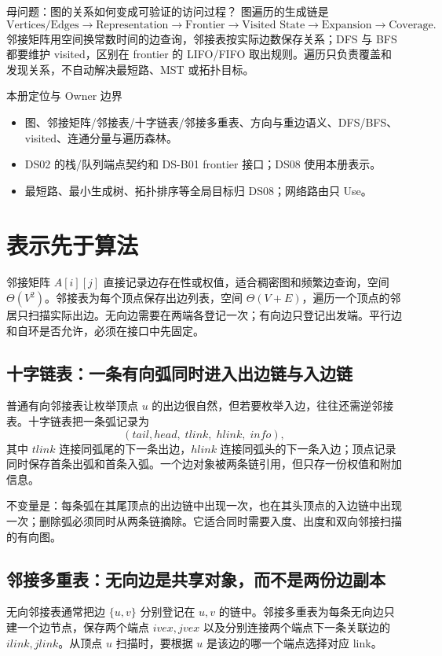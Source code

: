 \documentclass[UTF8,fontset=none,11pt,a4paper]{ctexart}
\begin{document}

\begin{corebox}{母问题：图的关系如何变成可验证的访问过程？}
图遍历的生成链是
\[
\text{Vertices/Edges}\to\text{Representation}\to\text{Frontier}\to\text{Visited State}\to\text{Expansion}\to\text{Coverage}.
\]
邻接矩阵用空间换常数时间的边查询，邻接表按实际边数保存关系；DFS 与 BFS 都要维护 visited，区别在 frontier 的 LIFO/FIFO 取出规则。遍历只负责覆盖和发现关系，不自动解决最短路、MST 或拓扑目标。
\end{corebox}
\begin{methodbox}{本册定位与 Owner 边界}
\begin{itemize}
\item {}图、邻接矩阵/邻接表/十字链表/邻接多重表、方向与重边语义、DFS/BFS、visited、连通分量与遍历森林。
\item {}DS02 的栈/队列端点契约和 DS-B01 frontier 接口；DS08 使用本册表示。
\item {}最短路、最小生成树、拓扑排序等全局目标归 DS08；网络路由只 Use。
\end{itemize}
\end{methodbox}
\tableofcontents\newpage

\section{表示先于算法}
邻接矩阵 $A[i][j]$ 直接记录边存在性或权值，适合稠密图和频繁边查询，空间 $\Theta(V^2)$。邻接表为每个顶点保存出边列表，空间 $\Theta(V+E)$，遍历一个顶点的邻居只扫描实际出边。无向边需要在两端各登记一次；有向边只登记出发端。平行边和自环是否允许，必须在接口中先固定。

\subsection{十字链表：一条有向弧同时进入出边链与入边链}
普通有向邻接表让枚举顶点 $u$ 的出边很自然，但若要枚举入边，往往还需逆邻接表。十字链表把一条弧记录为
\[
(tail,head,\;tlink,\;hlink,\;info),
\]
其中 $tlink$ 连接同弧尾的下一条出边，$hlink$ 连接同弧头的下一条入边；顶点记录同时保存首条出弧和首条入弧。一个边对象被两条链引用，但只存一份权值和附加信息。

不变量是：每条弧在其尾顶点的出边链中出现一次，也在其头顶点的入边链中出现一次；删除弧必须同时从两条链摘除。它适合同时需要入度、出度和双向邻接扫描的有向图。

\subsection{邻接多重表：无向边是共享对象，而不是两份边副本}
无向邻接表通常把边 $\{u,v\}$ 分别登记在 $u,v$ 的链中。邻接多重表为每条无向边只建一个边节点，保存两个端点 $ivex,jvex$ 以及分别连接两个端点下一条关联边的 $ilink,jlink$。从顶点 $u$ 扫描时，要根据 $u$ 是该边的哪一个端点选择对应 link。
\end{document}
